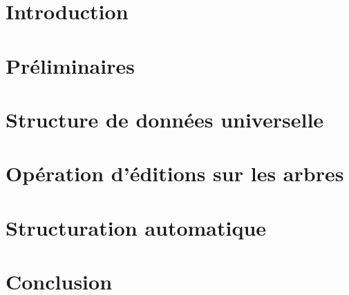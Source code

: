 \section{Introduction}


\section{Préliminaires}


\section{Structure de données universelle}


\section{Opération d'éditions sur les arbres}


\section{Structuration automatique}


\section{Conclusion}

